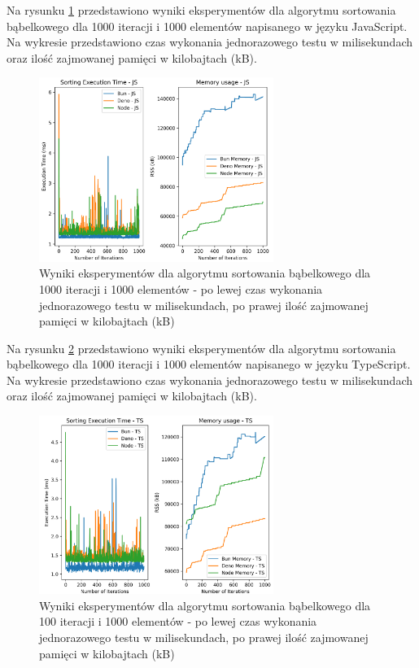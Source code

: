 Na rysunku \ref{fig:bubble_sorting_e3} przedstawiono wyniki eksperymentów dla algorytmu sortowania bąbelkowego dla 1000 iteracji i 1000 elementów napisanego w języku JavaScript. Na wykresie przedstawiono czas wykonania jednorazowego testu w milisekundach oraz ilość zajmowanej pamięci w kilobajtach (kB).

\begin{figure}[H]
  \centering
  \includegraphics[width=0.68\textwidth]{Figures/sorting/sorting_bubble_1000_1000_js.png}
  \caption{Wyniki eksperymentów dla algorytmu sortowania bąbelkowego dla 1000 iteracji i 1000 elementów - po lewej czas wykonania jednorazowego testu w milisekundach, po prawej ilość zajmowanej pamięci w kilobajtach (kB)}
  \label{fig:bubble_sorting_e3}
\end{figure}

Na rysunku \ref{fig:bubble_sorting_e3_ts} przedstawiono wyniki eksperymentów dla algorytmu sortowania bąbelkowego dla 1000 iteracji i 1000 elementów napisanego w języku TypeScript. Na wykresie przedstawiono czas wykonania jednorazowego testu w milisekundach oraz ilość zajmowanej pamięci w kilobajtach (kB).

\begin{figure}[H]
  \centering
  \includegraphics[width=0.68\textwidth]{Figures/sorting/sorting_bubble_1000_1000_ts.png}
  \caption{Wyniki eksperymentów dla algorytmu sortowania bąbelkowego dla 100 iteracji i 1000 elementów - po lewej czas wykonania jednorazowego testu w milisekundach, po prawej ilość zajmowanej pamięci w kilobajtach (kB)}
  \label{fig:bubble_sorting_e3_ts}
\end{figure}

